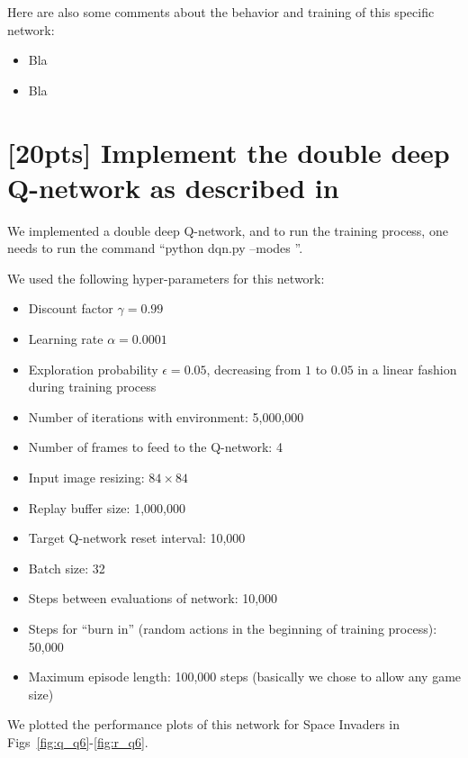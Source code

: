 \documentclass{article}
\begin{document}
Here are also some comments about the behavior and training of this specific network:

\begin{itemize}
  \item Bla
  \item Bla
\end{itemize}

\section{[20pts] Implement the double deep Q-network as described in \cite{van2016deep}}

We implemented a double deep Q-network, and to run the training process, one needs to run the command ``python dqn.py --modes ''.

We used the following hyper-parameters for this network:
\begin{itemize}
  \item Discount factor $\gamma=0.99$
  \item Learning rate $\alpha=0.0001$
  \item Exploration probability $\epsilon=0.05$, decreasing from $1$ to $0.05$ in a linear fashion during training process
  \item Number of iterations with environment: 5,000,000
  \item Number of frames to feed to the Q-network: 4
  \item Input image resizing: $84\times84$
  \item Replay buffer size: 1,000,000
  \item Target Q-network reset interval: 10,000
  \item Batch size: 32
  \item Steps between evaluations of network: 10,000
  \item Steps for ``burn in'' (random actions in the beginning of training process): 50,000
  \item Maximum episode length: 100,000 steps (basically we chose to allow any game size)
\end{itemize}

We plotted the performance plots of this network for Space Invaders in Figs~\ref{fig:q_q6}-\ref{fig:r_q6}.

\end{document}
